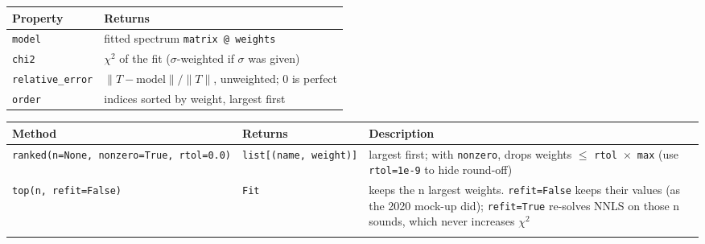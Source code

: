 \documentclass[
  10pt,
]{article}
\begin{document}
\begin{longtable}[]{@{}ll@{}}
\toprule
Property & Returns\tabularnewline
\midrule
\endhead
\texttt{model} & fitted spectrum
\texttt{matrix\ @\ weights}\tabularnewline
\texttt{chi2} & $\chi^2$ of the fit ($\sigma$-weighted if $\sigma$ was
given)\tabularnewline
\texttt{relative\_error} & $\lVert T - \text{model} \rVert / \lVert T \rVert$, unweighted; 0
is perfect\tabularnewline
\texttt{order} & indices sorted by weight, largest
first\tabularnewline
\bottomrule
\end{longtable}

\begin{longtable}[]{@{}lll@{}}
\toprule
\begin{minipage}[b]{0.30\columnwidth}\raggedright
Method\strut
\end{minipage} &
\begin{minipage}[b]{0.30\columnwidth}\raggedright
Returns\strut
\end{minipage} &
\begin{minipage}[b]{0.30\columnwidth}\raggedright
Description\strut
\end{minipage}\tabularnewline
\midrule
\endhead
\begin{minipage}[t]{0.30\columnwidth}\raggedright
\texttt{ranked(n=None,\ nonzero=True,\ rtol=0.0)}\strut
\end{minipage} &
\begin{minipage}[t]{0.30\columnwidth}\raggedright
\texttt{list{[}(name,\ weight){]}}\strut
\end{minipage} &
\begin{minipage}[t]{0.30\columnwidth}\raggedright
largest first; with \texttt{nonzero}, drops weights $\le$
\texttt{rtol}~$\times$~\texttt{max} (use \texttt{rtol=1e-9} to hide
round-off)\strut
\end{minipage}\tabularnewline
\begin{minipage}[t]{0.30\columnwidth}\raggedright
\texttt{top(n,\ refit=False)}\strut
\end{minipage} &
\begin{minipage}[t]{0.30\columnwidth}\raggedright
\texttt{Fit}\strut
\end{minipage} &
\begin{minipage}[t]{0.30\columnwidth}\raggedright
keeps the n largest weights. \texttt{refit=False} keeps
their values (as the 2020 mock-up did); \texttt{refit=True}
re-solves NNLS on those n sounds, which never increases
$\chi^2$\strut
\end{minipage}\tabularnewline
\begin{minipage}[t]{0.30\columnwidth}\raggedright

\end{minipage}
\end{longtable}
\end{document}
